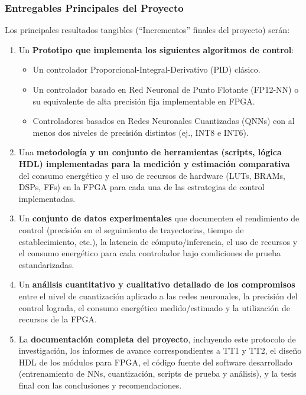 \documentclass[12pt]{article}
\begin{document}
\subsubsection{Entregables Principales del Proyecto}
\label{sssec:entregables_principales}
Los principales resultados tangibles (``Incrementos'' finales del proyecto) serán:
\begin{enumerate}
    \item Un \textbf{Prototipo que implementa los siguientes algoritmos de control}:
        \begin{itemize}
            \item Un controlador Proporcional-Integral-Derivativo (PID) clásico.
            \item Un controlador basado en Red Neuronal de Punto Flotante (FP12-NN) o su equivalente de alta precisión fija implementable en FPGA.
            \item Controladores basados en Redes Neuronales Cuantizadas (QNNs) con al menos dos niveles de precisión distintos (ej., INT8 e INT6).
        \end{itemize}
    \item Una \textbf{metodología y un conjunto de herramientas (scripts, lógica HDL) implementadas para la medición y estimación comparativa} del consumo energético y el uso de recursos de hardware (LUTs, BRAMs, DSPs, FFs) en la FPGA para cada una de las estrategias de control implementadas.
    \item Un \textbf{conjunto de datos experimentales} que documenten el rendimiento de control (precisión en el seguimiento de trayectorias, tiempo de establecimiento, etc.), la latencia de cómputo/inferencia, el uso de recursos y el consumo energético para cada controlador bajo condiciones de prueba estandarizadas.
    \item Un \textbf{análisis cuantitativo y cualitativo detallado de los compromisos} entre el nivel de cuantización aplicado a las redes neuronales, la precisión del control lograda, el consumo energético medido/estimado y la utilización de recursos de la FPGA.
    \item La \textbf{documentación completa del proyecto}, incluyendo este protocolo de investigación, los informes de avance correspondientes a TT1 y TT2, el diseño HDL de los módulos para FPGA, el código fuente del software desarrollado (entrenamiento de NNs, cuantización, scripts de prueba y análisis), y la tesis final con las conclusiones y recomendaciones.
\end{enumerate}
\end{document}
